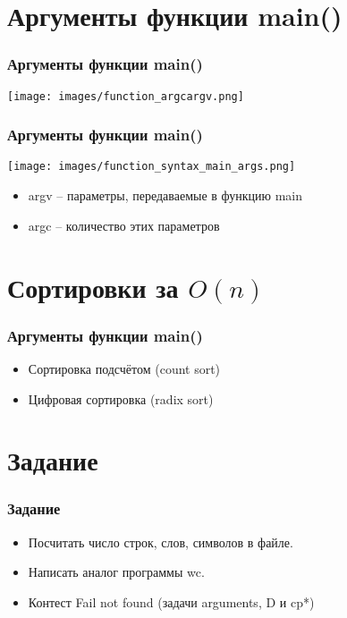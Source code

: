 \documentclass[12pt,pdf,hyperref={unicode}]{beamer}
\begin{document}
\section{Аргументы функции main()}

\begin{frame}[fragile]
\frametitle{Аргументы функции main()} 
\begin{center}
\texttt{[image: images/function\_argcargv.png]}
\end{center}
\end{frame}

\begin{frame}[fragile]
\frametitle{Аргументы функции main()}  
\begin{center}
\texttt{[image: images/function\_syntax\_main\_args.png]}
\end{center}
\begin{itemize}
\item argv -- параметры, передаваемые в функцию main
\item argc -- количество этих параметров
\end{itemize}
\end{frame}

\section{Сортировки за $O(n)$}


\begin{frame}[fragile]
\frametitle{Аргументы функции main()} 
\begin{itemize}
\item Сортировка подсчётом (count sort)
\item Цифровая сортировка (radix sort)
\end{itemize}
\end{frame}


\section{Задание}

\begin{frame}[fragile]
\frametitle{Задание} 
\begin{itemize}
\item Посчитать число строк, слов, символов в файле.
\item Написать аналог программы wc.
\item Контест Fail not found (задачи arguments, D и cp*)
\end{itemize}
\end{frame}
\end{document}
